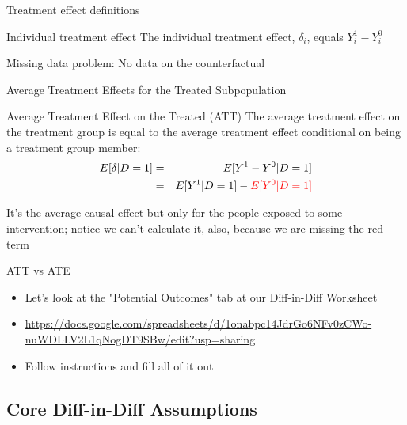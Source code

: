 \documentclass{beamer}
\begin{document}
\begin{frame}{Treatment effect definitions}


	\begin{block}{Individual treatment effect}
	    The individual treatment effect,  $\delta_i$, equals $Y_i^1-Y_i^0$
	\end{block}

Missing data problem:  No data on the counterfactual 
	
\end{frame}


\begin{frame}{Average Treatment Effects for the Treated Subpopulation}	
	\begin{block}{Average Treatment Effect on the Treated (ATT)}
	The average treatment effect on the treatment group is equal to the average treatment effect conditional on being a treatment group member:
		\begin{eqnarray*}
		E[\delta|D=1]&=&E[Y^1-Y^0|D=1] \nonumber \\
		&=&E[Y^1|D=1]-\textcolor{red}{E[Y^0|D=1]}
		\end{eqnarray*}
	\end{block}
	
	\bigskip

It's the average causal effect but only for the people exposed to some intervention; notice we can't calculate it, also, because we are missing the red term

	
\end{frame}

\begin{frame}{ATT vs ATE}

\begin{itemize}
\item Let's look at the "Potential Outcomes" tab at our Diff-in-Diff Worksheet 
\item \url{https://docs.google.com/spreadsheets/d/1onabpc14JdrGo6NFv0zCWo-nuWDLLV2L1qNogDT9SBw/edit?usp=sharing}
\item Follow instructions and fill all of it out
\end{itemize}

\end{frame}




\subsection{Core Diff-in-Diff Assumptions}
\end{document}
